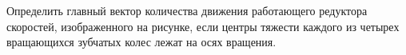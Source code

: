 Определить
главный вектор количества
движения работающего редуктора скоростей,
изображенного на рисунке,
если центры тяжести каждого из четырех вращающихся зубчатых колес лежат на осях вращения.
